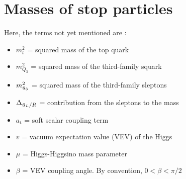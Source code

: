 
\section{Masses of stop particles}




Here, the terms not yet mentioned are \cite{martin1997supersymmetry, arbey2012higgs}:
\begin{itemize}
  \item $m^2_{t}$ = squared mass of the top quark
  \item $m^2_{Q_3}$ = squared mass of the third-family squark
  \item $ m^2_{\Bar{u}_3}$ = squared mass of the third-family sleptons
  \item $\Delta_{\Tilde{u}_L/R}$ = contribution from the sleptons to the mass
  \item $a_t$ = soft scalar coupling term
  \item $v$ = vacuum expectation value (VEV) of the Higgs
  \item $\mu$ = Higgs-Higgsino mass parameter
  \item $\beta$ = VEV coupling angle. By convention, $0 < \beta < \pi/2$
\end{itemize}

